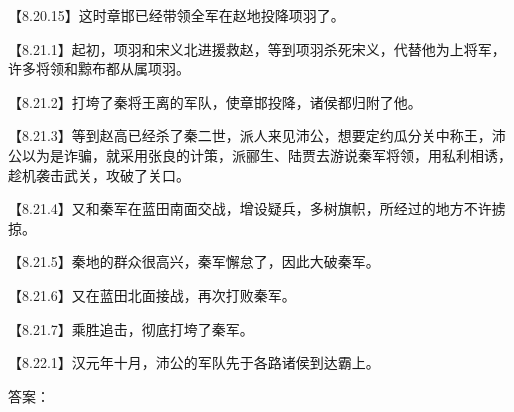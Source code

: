 \documentclass[fontset=none,11pt,a4paper]{ctexart}
\newcommand{\answerline}[1]{\underline{\hspace{#1}}}
\begin{document}
\begin{enumerate}[label=\Alph*.]
\noindent 【8.20.15】这时章邯已经带领全军在赵地投降项羽了。\par
\noindent 【8.21.1】起初，项羽和宋义北进援救赵，等到项羽杀死宋义，代替他为上将军，许多将领和黥布都从属项羽。\par
\noindent 【8.21.2】打垮了秦将王离的军队，使章邯投降，诸侯都归附了他。\par
\noindent 【8.21.3】等到赵高已经杀了秦二世，派人来见沛公，想要定约瓜分关中称王，沛公以为是诈骗，就采用张良的计策，派郦生、陆贾去游说秦军将领，用私利相诱，趁机袭击武关，攻破了关口。\par
\noindent 【8.21.4】又和秦军在蓝田南面交战，增设疑兵，多树旗帜，所经过的地方不许掳掠。\par
\noindent 【8.21.5】秦地的群众很高兴，秦军懈怠了，因此大破秦军。\par
\noindent 【8.21.6】又在蓝田北面接战，再次打败秦军。\par
\noindent 【8.21.7】乘胜追击，彻底打垮了秦军。\par
\noindent 【8.22.1】汉元年十月，沛公的军队先于各路诸侯到达霸上。\par
\end{enumerate}
答案：\answerline{2.2cm}
\end{document}
